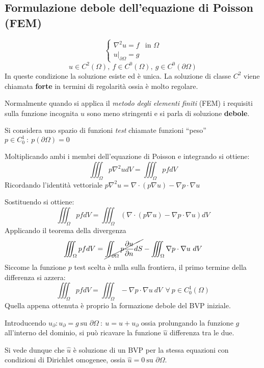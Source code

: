 \subsection{Formulazione debole dell'equazione di Poisson (FEM)}
\begin{equation*}
\begin{cases}
\nabla^2u = f & \text{in }\Omega\\
\left. u \right|_{\partial\Omega} = g
\end{cases}
\end{equation*}
$$
u \in C^2(\Omega),\ f \in C^0(\Omega),\ g\in C^0(\partial\Omega)
$$
In queste condizione la soluzione esiste ed è unica.
La soluzione di classe $C^2$ viene chiamata \textbf{forte} in termini di regolarità
ossia è molto regolare.

Normalmente quando si applica il \textit{metodo degli elementi finiti} (FEM) 
i requisiti sulla funzione incognita $u$ sono meno stringenti e si
parla di soluzione \textbf{debole}.

Si considera uno spazio di funzioni \textit{test} chiamate funzioni
``peso''  $p \in C^1_0\ : \ p(\partial\Omega) = 0$

Moltiplicando ambi i membri dell'equazione di Poisson e integrando si ottiene:
$$
\iiint_\Omega p\nabla^2 u dV = \iiint_\Omega p f dV
$$
Ricordando l'identità vettoriale $p\nabla^2 u = \nabla\cdot \left(p\nabla u\right) - \nabla p\cdot \nabla u $

Sostituendo si ottiene:
$$
\iiint_\Omega p f dV = \iiint_{\Omega} \left(\nabla\cdot\left(p\nabla u\right)-\nabla p\cdot\nabla u\right)dV
$$
Applicando il teorema della divergenza
$$
\iiint_\Omega p f dV = \cancel{\iint_{\partial\Omega} p \frac{\partial u}{\partial n}dS} - \iiint_\Omega \nabla p\cdot\nabla u\ dV
$$
Siccome la funzione $p$ test scelta è nulla sulla frontiera, il primo termine della differenza si azzera:
$$
\iiint_\Omega p f dV = \iiint_\Omega -\nabla p\cdot\nabla u\ dV\ \ \forall\ p\in C^1_0(\Omega)
$$
Quella appena ottenuta è proprio la formazione debole del BVP iniziale.

Introducendo $u_\partial : u_\partial = g\ \text{su } \partial\Omega\ : \ u = \hat{u} + u_\partial$ ossia prolungando
la funzione $g$ all'interno del dominio, si può ricavare la funzione $\hat{u}$ differenza tra le due.

Si vede dunque che $\hat{u}$ è soluzione di un BVP per la stessa equazioni con condizioni di
Dirichlet omogenee, ossia $\hat{u} = 0\ \text{su } \partial\Omega$.

